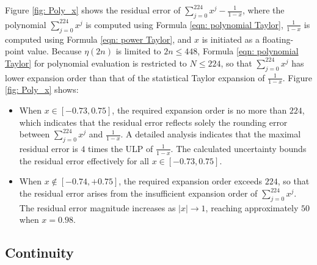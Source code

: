 \documentclass[twoside]{article}
\numberwithin{equation}{section}
\begin{document}
Figure \ref{fig: Poly_x} shows the residual error of $\sum_{j=0}^{224} x^j  - \frac{1}{1 - x}$, where the polynomial $\sum_{j=0}^{224} x^j$ is computed using Formula \eqref{eqn: polynomial Taylor}, $\frac{1}{1 - x}$ is computed using Formula \eqref{eqn: power Taylor}, and $x$ is initiated as a floating-point value.
Because $\eta(2n)$ is limited to $2n \leq 448$, Formula \eqref{eqn: polynomial Taylor} for polynomial evaluation is restricted to $N \leq 224$, so that $\sum_{j=0}^{224} x^j$ has lower expansion order than that of the statistical Taylor expansion of $\frac{1}{1 - x}$.
Figure \ref{fig: Poly_x} shows:
\begin{itemize}
\item
When $x \in [-0.73, 0.75]$, the required expansion order is no more than $224$, which indicates that the residual error reflects solely the rounding error between $\sum_{j=0}^{224} x^j$ and $\frac{1}{1 - x}$.
A detailed analysis indicates that the maximal residual error is $4$ times the ULP of $\frac{1}{1 - x}$.
The calculated uncertainty bounds the residual error effectively for all $x \in [-0.73, 0.75]$.

\item
When $x \not \in [-0.74, +0.75]$, the required expansion order exceeds $224$, so that the residual error arises from the insufficient expansion order of $\sum_{j=0}^{224} x^j$.
The residual error magnitude increases as $|x| \rightarrow 1$, reaching approximately $50$ when $x = 0.98$.
\end{itemize}



\subsection{Continuity}

\begin{table}
\centering
{}
\label{tbl: power continuity}
\end{table}
\end{document}
